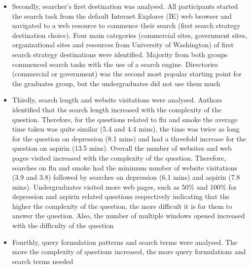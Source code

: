 \documentclass[]{article}
\begin{document}
\begin{enumerate}
\begin{itemize}
	\item Secondly, searcher's first destination was analysed. All participants started the search task from the default Internet Explorer (IE) web browser and navigated to a web resource to commence their search (first search strategy destination choice). Four main categories (commercial sites, government sites, organizational sites and resources from University of Washington) of first search strategy destinations were identified. Majority from both groups commenced search tasks with the use of a search engine. Directories (commercial or government) was the second most popular starting point for the graduates group, but the undergraduates did not use them much
	
	\item  Thirdly, search length and website visitations were analysed. Authors identified that the search length increased with the complexity of the question. Therefore, for the questions related to flu and smoke the average time taken was quite similar (5.4 and 4.4 mins), the time was twice as long for the question on depression (8.1 mins) and had a threefold increase for the question on aspirin (13.5 mins). Overall the number of websites and web pages visited increased with the complexity of the question. Therefore, searches on flu and smoke had the minimum number of website visitations (3.9 and 3.8) followed by searches on depression (6.1 mins) and aspirin (7.8 mins). Undergraduates visited more web pages, such as 50\% and 100\% for depression and aspirin related questions respectively indicating that the higher the complexity of the question, the more difficult it is for them to answer the question. Also, the number of multiple windows opened increased with the difficulty of the question
	
	\item Fourthly, query formulation patterns and search terms were analysed. The more the complexity of questions increased, the more query formulations and search terms needed
	

\end{itemize}
\end{enumerate}
\end{document}
